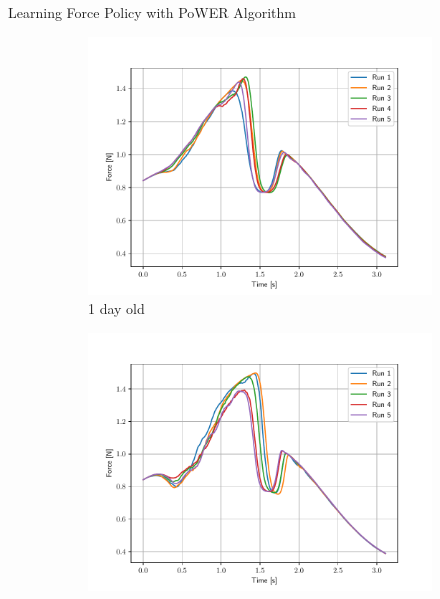 \documentclass[aspectratio=169]{beamer}
\newenvironment{figure*}%
{\begin{figure}}
	{\end{figure}}
\begin{document}
\begin{frame}
	Learning Force Policy with PoWER Algorithm
	\vspace{-0.3cm}
	\scriptsize
	\begin{figure}[t]
		\begin{subfigure}[t]{0.32\textwidth}
			\centering
			\includegraphics[width=\textwidth]{images/f_banana_1.pdf}
					\vspace{-0.32cm}
			\caption{\scriptsize 1 day old}
			\label{EX:f_banana_1}
		\end{subfigure}
		\begin{subfigure}[t]{0.32\textwidth}
			\centering
			\includegraphics[width=\textwidth]{images/f_banana_2.pdf}
					\vspace{-0.32cm}

\end{subfigure}
\end{figure}
\end{frame}
\end{document}
